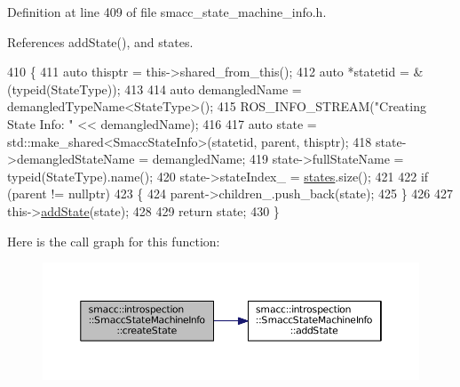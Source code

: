 Definition at line 409 of file smacc\+\_\+state\+\_\+machine\+\_\+info.\+h.



References add\+State(), and states.


\begin{DoxyCode}
410 \{
411     \textcolor{keyword}{auto} thisptr = this->shared\_from\_this();
412     \textcolor{keyword}{auto} *statetid = &(\textcolor{keyword}{typeid}(StateType));
413 
414     \textcolor{keyword}{auto} demangledName = demangledTypeName<StateType>();
415     ROS\_INFO\_STREAM(\textcolor{stringliteral}{"Creating State Info: "} << demangledName);
416 
417     \textcolor{keyword}{auto} state = std::make\_shared<SmaccStateInfo>(statetid, parent, thisptr);
418     state->demangledStateName = demangledName;
419     state->fullStateName = \textcolor{keyword}{typeid}(StateType).name();
420     state->stateIndex\_ = \hyperlink{classsmacc_1_1introspection_1_1SmaccStateMachineInfo_aef31d74ad3669f0b0f57fe0e008cd2f8}{states}.size();
421 
422     \textcolor{keywordflow}{if} (parent != \textcolor{keyword}{nullptr})
423     \{
424         parent->children\_.push\_back(state);
425     \}
426 
427     this->\hyperlink{classsmacc_1_1introspection_1_1SmaccStateMachineInfo_ab4eafccfbba21257405fc4274c2ed22a}{addState}(state);
428 
429     \textcolor{keywordflow}{return} state;
430 \}
\end{DoxyCode}


Here is the call graph for this function\+:
\nopagebreak
\begin{figure}[H]
\begin{center}
\leavevmode
\includegraphics[width=350pt]{classsmacc_1_1introspection_1_1SmaccStateMachineInfo_ad3eacdb32594e603fb36a8ab478d0ce7_cgraph}
\end{center}
\end{figure}


